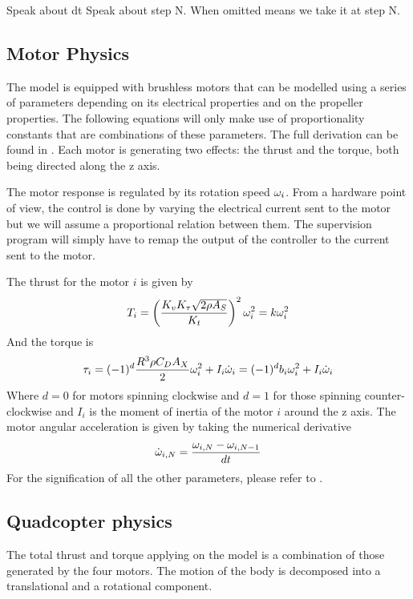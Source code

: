 Speak about dt
Speak about step N. When omitted means we take it at step N.

\subsection{Motor Physics}
The model is equipped with brushless motors that can be modelled using a series
of parameters depending on its electrical properties and on the propeller
properties. The following equations will only make use of proportionality
constants that are combinations of these parameters. The full derivation can be
found in .
Each motor is generating two effects: the thrust and the torque, both being directed along the z axis.
	
The motor response is regulated by its rotation speed $\omega_i$. From a hardware
point of view, the control is done by varying the electrical current sent to
the motor but we will assume a proportional relation between them. The
supervision program will simply have to remap the output of the controller to
the current sent to the motor.

The thrust for the motor $i$ is given by
\begin{equation}\labeleq{motorThrust}
	T_i = \left(\frac{K_vK_\tau\sqrt{2\rho A_S}}{K_t}\right)^2\om^2
	= k\om^2
\end{equation}
And the torque is
\begin{equation}\labeleq{motorTau}
	\tau_i = (-1)^{d}\frac{R^3\rho C_D A_X}{2}\om^2 + I_i\omd = (-1)^{d}b_i\om^2
	+ I_i\omd
\end{equation}
Where $d=0$ for motors spinning clockwise and $d=1$ for those spinning
counter-clockwise and $I_i$ is the moment of inertia of the motor $i$ around the z
axis. The motor angular acceleration is given by taking the numerical derivative
\begin{equation}
	\dot{\omega}_{i,N} = \frac{\omega_{i,N}-\omega_{i,N-1}}{dt}
\end{equation} 
For the signification of all the other parameters, please refer to .

\subsection{Quadcopter physics}
The total thrust and torque applying on the model is a combination of those
generated by the four motors. The motion of the body is decomposed into a
translational and a rotational component.

